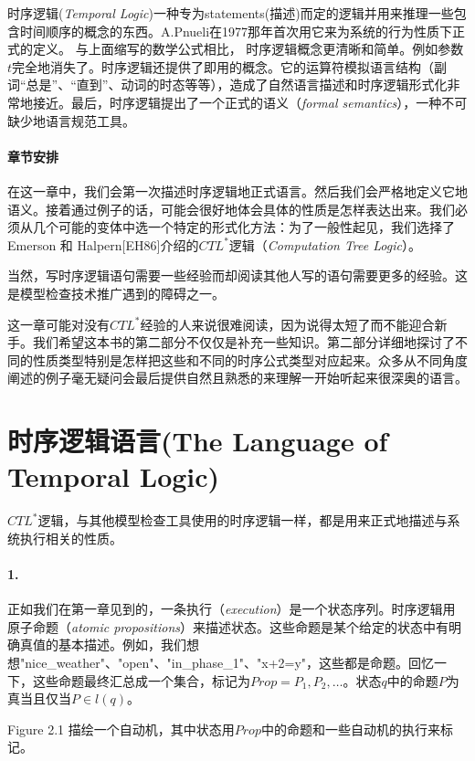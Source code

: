 \documentclass{book}
\begin{document}
    时序逻辑({\itshape Temporal Logic})一种专为statements(描述)而定的逻辑并用来推理一些包含时间顺序的概念的东西。A.Pnueli在1977那年首次用它来为系统的行为性质下正式的定义。 与上面缩写的数学公式相比， 时序逻辑概念更清晰和简单。例如参数$t$完全地消失了。时序逻辑还提供了即用的概念。它的运算符模拟语言结构（副词“总是”、“直到”、动词的时态等等），造成了自然语言描述和时序逻辑形式化非常地接近。最后，时序逻辑提出了一个正式的语义（{\itshape formal semantics}），一种不可缺少地语言规范工具。

    \paragraph{章节安排} 在这一章中，我们会第一次描述时序逻辑地正式语言。然后我们会严格地定义它地语义。接着通过例子的话，可能会很好地体会具体的性质是怎样表达出来。我们必须从几个可能的变体中选一个特定的形式化方法：为了一般性起见，我们选择了Emerson 和 Halpern[EH86]介绍的$CTL^*$逻辑（{\itshape Computation Tree Logic}）。

    当然，写时序逻辑语句需要一些经验而却阅读其他人写的语句需要更多的经验。这是模型检查技术推广遇到的障碍之一。

    这一章可能对没有$CTL^*$经验的人来说很难阅读，因为说得太短了而不能迎合新手。我们希望这本书的第二部分不仅仅是补充一些知识。第二部分详细地探讨了不同的性质类型特别是怎样把这些和不同的时序公式类型对应起来。众多从不同角度阐述的例子毫无疑问会最后提供自然且熟悉的来理解一开始听起来很深奥的语言。

    \section{时序逻辑语言(The Language of Temporal Logic)}

    \quad $CTL^*$逻辑，与其他模型检查工具使用的时序逻辑一样，都是用来正式地描述与系统执行相关的性质。

    \paragraph{1.} 正如我们在第一章见到的，一条执行（{\itshape execution}）是一个状态序列。时序逻辑用原子命题（{\itshape atomic propositions}）来描述状态。这些命题是某个给定的状态中有明确真值的基本描述。例如，我们想想"nice\_weather"、"open"、"in\_phase\_1"、"x+2=y"，这些都是命题。回忆一下，这些命题最终汇总成一个集合，标记为$Prop={P_1,P_2,\dots}$。状态$q$中的命题$P$为真当且仅当$P \in l(q)$。

    Figure 2.1 描绘一个自动机，其中状态用$Prop$中的命题和一些自动机的执行来标记。
\end{document}
